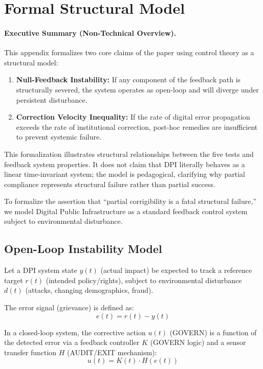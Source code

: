 \documentclass{article}
\begin{document}
\section{Formal Structural Model}
\label{appendix:proofs}

\paragraph{Executive Summary (Non-Technical Overview).}
This appendix formalizes two core claims of the paper using control theory as a structural model:
\begin{enumerate}[noitemsep]
    \item \textbf{Null-Feedback Instability:} If any component of the feedback path is structurally severed, the system operates as open-loop and will diverge under persistent disturbance.
    \item \textbf{Correction Velocity Inequality:} If the rate of digital error propagation exceeds the rate of institutional correction, post-hoc remedies are insufficient to prevent systemic failure.
\end{enumerate}
This formalization illustrates structural relationships between the five tests and feedback system properties. It does not claim that DPI literally behaves as a linear time-invariant system; the model is pedagogical, clarifying why partial compliance represents structural failure rather than partial success.

\medskip

To formalize the assertion that ``partial corrigibility is a fatal structural failure,'' we model Digital Public Infrastructure as a standard feedback control system subject to environmental disturbance.

\subsection{Open-Loop Instability Model}

Let a DPI system state $y(t)$ (actual impact) be expected to track a reference target $r(t)$ (intended policy/rights), subject to environmental disturbance $d(t)$ (attacks, changing demographics, fraud).

The error signal (grievance) is defined as:
\begin{equation}
e(t) = r(t) - y(t)
\end{equation}

In a closed-loop system, the corrective action $u(t)$ (GOVERN) is a function of the detected error via a feedback controller $K$ (GOVERN logic) and a sensor transfer function $H$ (AUDIT/EXIT mechanism):
\begin{equation}
u(t) = K(t) \cdot H(e(t))
\end{equation}
\end{document}
